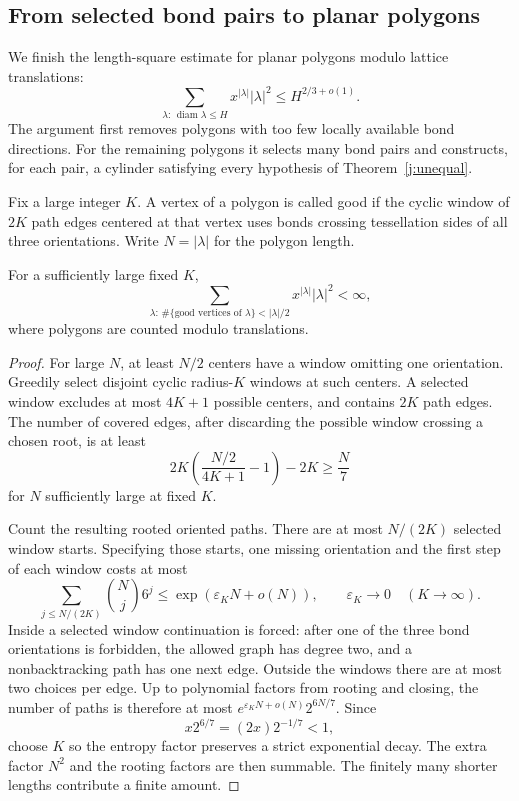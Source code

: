 \subsection{From selected bond pairs to planar polygons}

We finish the length-square estimate for planar polygons modulo lattice
translations:
\begin{equation}\label{c7:eq-Pol}
 \sum_{\lambda:\,\operatorname{diam}\lambda\le H}
 x^{|\lambda|}|\lambda|^2\le H^{2/3+o(1)}.
\end{equation}
The argument first removes polygons with too few locally available bond
directions. For the remaining polygons it selects many bond pairs and
constructs, for each pair, a cylinder satisfying every hypothesis of
Theorem~\ref{j:unequal}.

Fix a large integer $K$. A vertex of a polygon is called good if the
cyclic window of $2K$ path edges centered at that vertex uses bonds
crossing tessellation sides
of all three orientations. Write $N=|\lambda|$ for the polygon length.

\begin{lemma}
\label{c7:bad-windows}
For a sufficiently large fixed $K$,
\[
 \sum_{\lambda:\,\#\{\text{good vertices of }\lambda\}<|\lambda|/2}
 x^{|\lambda|}|\lambda|^2<\infty,
\]
where polygons are counted modulo translations.
\end{lemma}

\begin{proof}
For large $N$, at least $N/2$ centers have a window omitting one
orientation. Greedily select disjoint cyclic radius-$K$ windows at
such centers. A selected window excludes at most $4K+1$ possible
centers, and contains $2K$ path edges. The number of covered edges,
after discarding the possible window crossing a chosen root, is at least
\[
 2K\left(\frac{N/2}{4K+1}-1\right)-2K\ge \frac N7
\]
for $N$ sufficiently large at fixed $K$.

Count the resulting rooted oriented paths. There are at most $N/(2K)$
selected window starts. Specifying those starts, one missing orientation
and the first step of each window costs at most
\[
 \sum_{j\le N/(2K)}\binom Nj6^j
 \le \exp(\varepsilon_K N+o(N)),\qquad \varepsilon_K\longrightarrow0
 \quad(K\to\infty).
\]
Inside a selected window continuation is forced: after one of the
three bond orientations is forbidden, the allowed graph has degree
two, and a nonbacktracking path has one next edge. Outside the windows
there are at most two choices per edge. Up to polynomial factors from
rooting and closing, the number of paths is therefore at most
$e^{\varepsilon_KN+o(N)}2^{6N/7}$. Since
\[
 x2^{6/7}=(2x)2^{-1/7}<1,
\]
choose $K$ so the entropy factor preserves a strict exponential decay.
The extra factor $N^2$ and the rooting factors are then summable. The
finitely many shorter lengths contribute a finite amount.
\end{proof}

